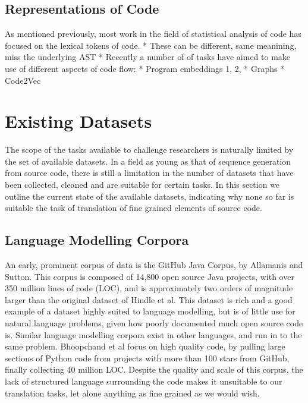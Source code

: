 \subsection{Representations of Code}

As mentioned previously, most work in the field of statistical analysis of code has focused on the lexical tokens of code. 
* These can be different, same meanining, miss the underlying AST
* Recently a number of of tasks have aimed to make use of different aspects of code flow:
* Program embeddings 1, 2, 
* Graphs
* Code2Vec

\section{Existing Datasets}

The scope of the tasks available to challenge researchers is naturally limited by the set of available datasets.
In a field as young as that of sequence generation from source code, there is still a limitation in the number of datasets that have been collected, cleaned and are suitable for certain tasks.
In this section we outline the current state of the available datasets, indicating why none so far is suitable the task of translation of fine grained elements of source code.

\subsection{Language Modelling Corpora}
An early, prominent corpus of data is the GitHub Java Corpus, by Allamanis and Sutton\cite{allamanis_mining_2013}. This corpus is composed of 14,800 open source Java projects, with over 350 million lines of code (LOC), and is approximately two orders of magnitude larger than the original dataset of Hindle et al. This dataset is rich and a good example of a dataset highly suited to language modelling, but is of little use for natural language problems, given how poorly documented much open source code is.
Similar language modelling corpora exist in other languages, and run in to the same problem. Bhoopchand et al \cite{bhoopchand_learning_2016} focus on high quality code, by pulling large sections of Python code from projects with more than 100 stars from GitHub, finally collecting 40 million LOC. 
Despite the quality and scale of this corpus, the lack of structured language surrounding the code makes it unsuitable to our translation tasks, let alone anything as fine grained as we would wish.

